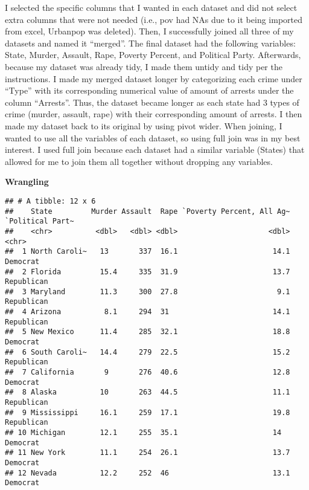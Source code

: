 \documentclass[]{article}
\newenvironment{Shaded}{\begin{snugshade}}{\end{snugshade}}
\newcommand{\CommentTok}[1]{\textcolor[rgb]{0.56,0.35,0.01}{\textit{#1}}}
\newcommand{\DecValTok}[1]{\textcolor[rgb]{0.00,0.00,0.81}{#1}}
\newcommand{\KeywordTok}[1]{\textcolor[rgb]{0.13,0.29,0.53}{\textbf{#1}}}
\newcommand{\NormalTok}[1]{#1}
\newcommand{\OperatorTok}[1]{\textcolor[rgb]{0.81,0.36,0.00}{\textbf{#1}}}
\begin{document}
I selected the specific columns that I wanted in each dataset and did
not select extra columns that were not needed (i.e., pov had NAs due to
it being imported from excel, Urbanpop was deleted). Then, I
successfully joined all three of my datasets and named it ``merged''.
The final dataset had the following variables: State, Murder, Assault,
Rape, Poverty Percent, and Political Party. Afterwards, because my
dataset was already tidy, I made them untidy and tidy per the
instructions. I made my merged dataset longer by categorizing each crime
under ``Type'' with its corresponding numerical value of amount of
arrests under the column ``Arrests''. Thus, the dataset became longer as
each state had 3 types of crime (murder, assault, rape) with their
corresponding amount of arrests. I then made my dataset back to its
original by using pivot wider. When joining, I wanted to use all the
variables of each dataset, so using full join was in my best interest. I
used full join because each dataset had a similar variable (States) that
allowed for me to join them all together without dropping any variables.

\textbf{Wrangling}

\begin{Shaded}
\end{Shaded}

\begin{verbatim}
## # A tibble: 12 x 6
##    State         Murder Assault  Rape `Poverty Percent, All Ag~ `Political Part~
##    <chr>          <dbl>   <dbl> <dbl>                     <dbl> <chr>           
##  1 North Caroli~   13       337  16.1                      14.1 Democrat        
##  2 Florida         15.4     335  31.9                      13.7 Republican      
##  3 Maryland        11.3     300  27.8                       9.1 Republican      
##  4 Arizona          8.1     294  31                        14.1 Republican      
##  5 New Mexico      11.4     285  32.1                      18.8 Democrat        
##  6 South Caroli~   14.4     279  22.5                      15.2 Republican      
##  7 California       9       276  40.6                      12.8 Democrat        
##  8 Alaska          10       263  44.5                      11.1 Republican      
##  9 Mississippi     16.1     259  17.1                      19.8 Republican      
## 10 Michigan        12.1     255  35.1                      14   Democrat        
## 11 New York        11.1     254  26.1                      13.7 Democrat        
## 12 Nevada          12.2     252  46                        13.1 Democrat
\end{verbatim}
\end{document}
